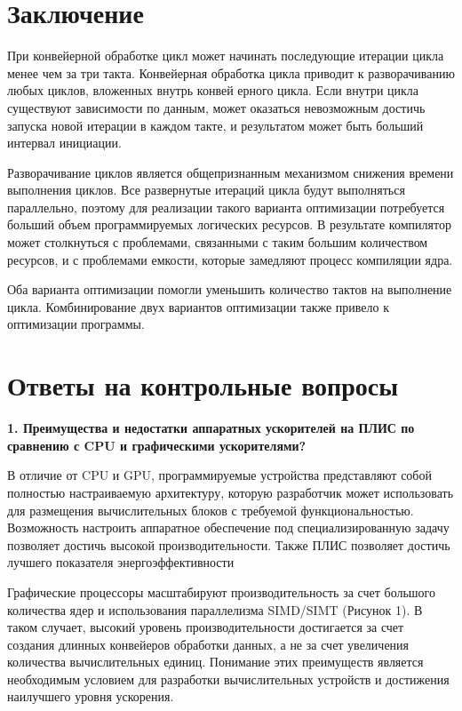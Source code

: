 \newpage
\section{Заключение}
При конвейерной обработке цикл может начинать последующие
итерации цикла менее чем за три такта. Конвейерная обработка цикла
приводит к разворачиванию любых циклов, вложенных внутрь конвей­
ерного цикла. Если внутри цикла существуют зависимости по данным,
может оказаться невозможным достичь запуска новой итерации в каждом
такте, и результатом может быть больший интервал инициации.

Разворачивание циклов является общепризнанным механизмом
снижения времени выполнения циклов. Все развернутые итераций цикла
будут выполняться параллельно, поэтому для реализации такого варианта
оптимизации потребуется больший объем программируемых логических
ресурсов. В результате компилятор может столкнуться с проблемами,
связанными с таким большим количеством ресурсов, и с проблемами
емкости, которые замедляют процесс компиляции ядра.

Оба варианта оптимизации помогли уменьшить количество тактов
на выполнение цикла. Комбинирование двух вариантов оптимизации
также привело к оптимизации программы.

\newpage
\section{Ответы на контрольные вопросы}

\textbf{1. Преимущества и недостатки аппаратных ускорителей на ПЛИС по сравнению с CPU и графическими ускорителями?}

В отличие от CPU и GPU, программируемые устройства представляют собой полностью настраиваемую архитектуру, которую разработчик может использовать для размещения вычислительных блоков с требуемой функциональностью. Возможность настроить аппаратное обеспечение под специализированную задачу позволяет достичь высокой производительности. Также ПЛИС позволяет достичь лучшего показателя энергоэффективности

 Графические процессоры масштабируют производительность за счет большого количества ядер и использования параллелизма SIMD/SIMT (Рисунок 1).  В таком случает, высокий уровень производительности достигается за счет создания длинных конвейеров обработки данных, а не за счет увеличения количества вычислительных единиц. Понимание этих преимуществ является необходимым условием для разработки вычислительных устройств и достижения наилучшего уровня ускорения.

